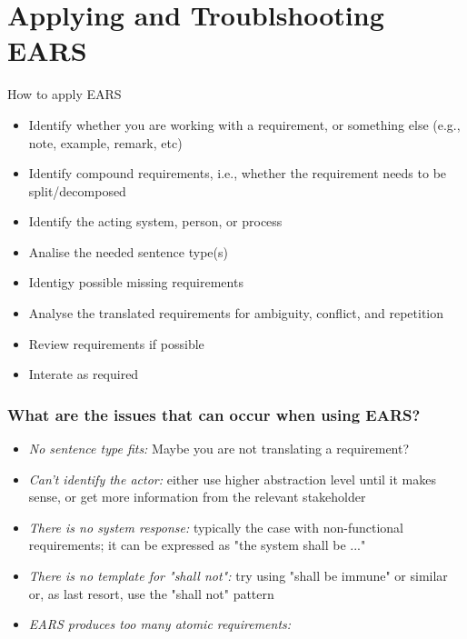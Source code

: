 \documentclass[aspectratio=169]{beamer}
\begin{document}
\section*{Applying and Troublshooting EARS}

\begin{slide}{How to apply EARS}
  \begin{itemize}
  \item Identify whether you are working with a requirement, or something else (e.g., note, example, remark, etc)
  \item Identify compound requirements, i.e., whether the requirement needs to be split/decomposed 
  \item Identify the acting system, person, or process
  \item Analise the needed sentence type(s)
  \item Identigy possible missing requirements
  \item Analyse the translated requirements for ambiguity, conflict, and repetition
  \item Review requirements if possible
  \item Interate as required
  \end{itemize}
\end{slide}
%
%
\begin{frame}
  \frametitle{What are the issues that can occur when using EARS?}
  \begin{itemize}
  \item {\it No sentence type fits:} Maybe you are not translating a requirement?
  \item {\it Can't identify the actor:} either use higher abstraction level until it makes sense, or get more information from the relevant stakeholder
  \item {\it There is no system response:}  typically the case with non-functional requirements; it can be expressed as "the system shall be ..."
  \item {\it There is no template for "shall not":} try using "shall be immune" or similar or, as last resort, use the "shall not" pattern
  \item {\it EARS produces too many atomic requirements:} 
  \end{itemize}
  
\end{frame}
\end{document}
